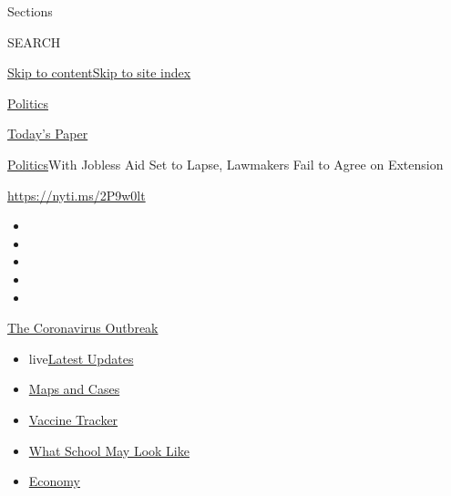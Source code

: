 Sections

SEARCH

\protect\hyperlink{site-content}{Skip to
content}\protect\hyperlink{site-index}{Skip to site index}

\href{https://www.nytimes.com/section/politics}{Politics}

\href{https://myaccount.nytimes.com/auth/login?response_type=cookie\&client_id=vi}{}

\href{https://www.nytimes.com/section/todayspaper}{Today's Paper}

\href{/section/politics}{Politics}\textbar{}With Jobless Aid Set to
Lapse, Lawmakers Fail to Agree on Extension

\url{https://nyti.ms/2P9w0lt}

\begin{itemize}
\item
\item
\item
\item
\item
\end{itemize}

\href{https://www.nytimes.com/news-event/coronavirus?action=click\&pgtype=Article\&state=default\&region=TOP_BANNER\&context=storylines_menu}{The
Coronavirus Outbreak}

\begin{itemize}
\tightlist
\item
  live\href{https://www.nytimes.com/2020/08/01/world/coronavirus-covid-19.html?action=click\&pgtype=Article\&state=default\&region=TOP_BANNER\&context=storylines_menu}{Latest
  Updates}
\item
  \href{https://www.nytimes.com/interactive/2020/us/coronavirus-us-cases.html?action=click\&pgtype=Article\&state=default\&region=TOP_BANNER\&context=storylines_menu}{Maps
  and Cases}
\item
  \href{https://www.nytimes.com/interactive/2020/science/coronavirus-vaccine-tracker.html?action=click\&pgtype=Article\&state=default\&region=TOP_BANNER\&context=storylines_menu}{Vaccine
  Tracker}
\item
  \href{https://www.nytimes.com/interactive/2020/07/29/us/schools-reopening-coronavirus.html?action=click\&pgtype=Article\&state=default\&region=TOP_BANNER\&context=storylines_menu}{What
  School May Look Like}
\item
  \href{https://www.nytimes.com/live/2020/07/31/business/stock-market-today-coronavirus?action=click\&pgtype=Article\&state=default\&region=TOP_BANNER\&context=storylines_menu}{Economy}
\end{itemize}

